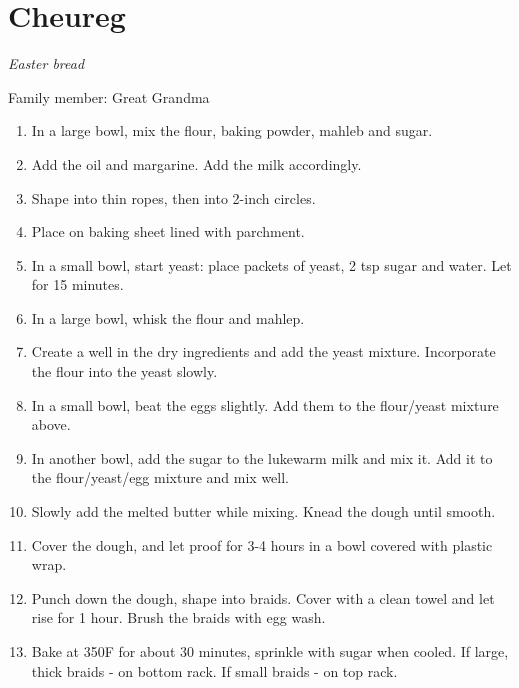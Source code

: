 \chapter{Cheureg}
\label{ch:cheureg}


\textit{Easter bread}

Family member: Great Grandma

\begin{enumerate}
    \item In a large bowl, mix the flour, baking powder, mahleb and sugar.
    \item Add the oil and margarine. Add the milk accordingly.
    \item Shape into thin ropes, then into 2-inch circles.
    \item Place on baking sheet lined with parchment.
    \item In a small bowl, start yeast: place packets of yeast, 2 tsp sugar and water. Let for 15 minutes.
    \item In a large bowl, whisk the flour and mahlep. 
    \item Create a well in the dry ingredients and add the yeast mixture. Incorporate the flour into the yeast slowly.
    \item In a small bowl, beat the eggs slightly. Add them to the flour/yeast mixture above.
    \item In another bowl, add the sugar to the lukewarm milk and mix it. Add it to the flour/yeast/egg mixture and mix well.
    \item Slowly add the melted butter while mixing. Knead the dough until smooth.
    \item Cover the dough, and let proof for 3-4 hours in a bowl covered with plastic wrap.
    \item Punch down the dough, shape into braids. Cover with a clean towel and let rise for 1 hour. Brush the braids with egg wash.
    \item Bake at 350\degree F for about 30 minutes, sprinkle with sugar when cooled.
    If large, thick braids - on bottom rack.
    If small braids - on top rack.
\end{enumerate}
